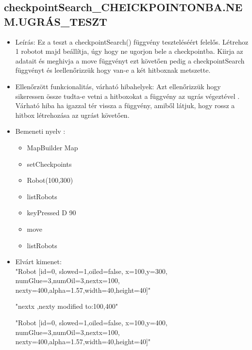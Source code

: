 \subsection{checkpointSearch\_CHEICKPOINTONBA.NEM.UGRÁS\_TESZT}
\begin{itemize}
	\item Leírás: Ez a teszt a checkpointSearch() függvény teszteléséért felelős.
			Létrehoz 1 robotot majd beállítja, úgy hogy ne ugorjon bele a checkpointba.
			Kiirja az adatait  és meghivja a move függvényt ezt követően pedig a checkpointSearch függvényt és leellenőrizzük hogy van-e a két hitboxnak metszette.\newline
	\item Ellenőrzött funkcionalitás, várható hibahelyek: Azt ellenőrizzük hogy sikeressen össze tudta-e vetni a hitboxokat a függvény az ugrás                     végeztével .
	        Várható hiba ha igazzal tér vissza a függvény, amiből látjuk, hogy rossz a hitbox létrehozása  az ugrást követően.
	\item Bemeneti nyelv :
		\begin{itemize}
        \item MapBuilder Map
        \item setCheckpoints
		\item Robot(100,300)
		\item listRobots
		\item keyPressed D 90 
		\item move
		\item listRobots
		\end{itemize}

	\item Elvárt kimenet: \\
		"Robot [id=0,  slowed=1,oiled=false, x=100,y=300, 
		\\numGlue=3,numOil=3,nextx=100,
		\\nexty=400,alpha=1.57,width=40,height=40]"\newline
		
		"nextx ,nexty modified to:100,400"\newline
	
		 "Robot [id=0,  slowed=1,oiled=false, x=100,y=400, 
		\\numGlue=3,numOil=3,nextx=100,
		\\nexty=400,alpha=1.57,width=40,height=40]"\newline
	
\end{itemize}


